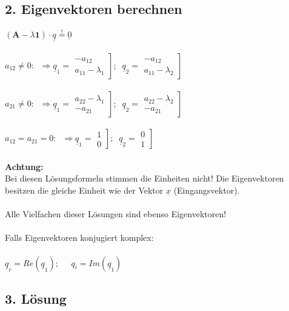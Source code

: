 \documentclass[a4paper,twocolumn,10pt]{article}
\newcommand{\sollsein}{\stackrel{!}{=}}
\begin{document}
\subsection*{2. Eigenvektoren berechnen}
$(\textbf{A}-\lambda \textbf{1})\cdot \underline{q}\sollsein \underline{0}$\\\\
$a_{12}\ne 0:\;\;\Rightarrow \underline{q}_1=\left.\begin{matrix}-a_{12} \\ a_{11}-\lambda_1\end{matrix}\right];\;\; \underline{q}_2=\left.\begin{matrix}-a_{12} \\ a_{11}-\lambda_2\end{matrix}\right]$\\\\
$a_{21}\ne 0:\;\;\Rightarrow \underline{q}_1=\left.\begin{matrix}a_{22}-\lambda_1 \\ -a_{21}\end{matrix}\right];\;\; \underline{q}_2=\left.\begin{matrix}a_{22}-\lambda_2 \\ -a_{21}\end{matrix}\right]$\\\\
$a_{12}=a_{21}= 0:\;\;\Rightarrow \underline{q}_1=\left.\begin{matrix}1 \\ 0\end{matrix}\right];\;\; \underline{q}_2=\left.\begin{matrix}0 \\ 1\end{matrix}\right]$\\\\
\textbf{Achtung:}\\
Bei diesen Lösungsformeln stimmen die Einheiten nicht! Die Eigenvektoren besitzen die gleiche Einheit wie der Vektor $\underline{x}$ (Eingangsvektor).\\\\
Alle Vielfachen dieser Lösungen sind ebenso Eigenvektoren!\\\\
Falls Eigenvektoren konjugiert komplex:\\\\
$\underline{q}_r=Re(\underline{q}_1);\;\;\;\;\;q_i=Im(\underline{q}_1)$
\subsection*{3. Lösung}
\end{document}
